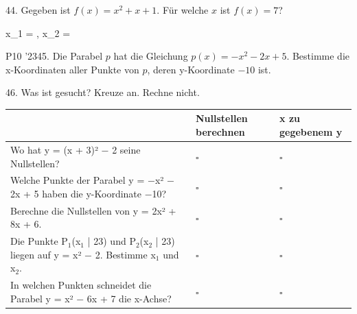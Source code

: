 \documentclass[11pt]{article}
\begin{document}
\pfgruppe{}
\begin{pfaufg}{}{44.}{}
Gegeben ist $f(x) = x^2 + x + 1$. Für welche $x$ ist $f(x) = 7$?
\par\noindent x\_1 = \leerfeld , x\_2 = \leerfeld \par
{}
\end{pfaufg}
\pfgruppe{}
\begin{pfaufg}{P10 ’23}{\llap{\textasteriskcentered\,}45.}{}
Die Parabel $p$ hat die Gleichung $p(x) = -x^2 - 2x + 5$. Bestimme die x-Koordinaten aller Punkte von $p$, deren y-Koordinate $-10$ ist.
\end{pfaufg}
\par\Needspace*{0.55\textheight}
\begin{pfaufg}{}{46.}{}
Was ist gesucht? Kreuze an. Rechne nicht.
\par\smallskip\noindent \begingroup\renewcommand{\arraystretch}{1.4}\begin{tabular}{|>{\raggedright\arraybackslash}p{8.3cm}|>{\centering\arraybackslash\hyphenpenalty=0}p{1.55cm}|>{\centering\arraybackslash\hyphenpenalty=0}p{1.55cm}|}\hline  & {\scriptsize\hspace{0pt}Nullstellen berechnen} & {\scriptsize\hspace{0pt}x zu gegebenem y} \\ \hline Wo hat y = (x + 3)² $-$ 2 seine Nullstellen? & $\square$ & $\square$ \\ \hline Welche Punkte der Parabel y = $-$x² $-$ 2x + 5 haben die y-Koordinate $-$10? & $\square$ & $\square$ \\ \hline Berechne die Nullstellen von y = 2x² + 8x + 6. & $\square$ & $\square$ \\ \hline Die Punkte P$_1$(x$_1$ | 23) und P$_2$(x$_2$ | 23) liegen auf y = x² $-$ 2. Bestimme x$_1$ und x$_2$. & $\square$ & $\square$ \\ \hline In welchen Punkten schneidet die Parabel y = x² $-$ 6x + 7 die x-Achse? & $\square$ & $\square$ \\ \hline\end{tabular}\endgroup\par
\end{pfaufg}
\end{document}
